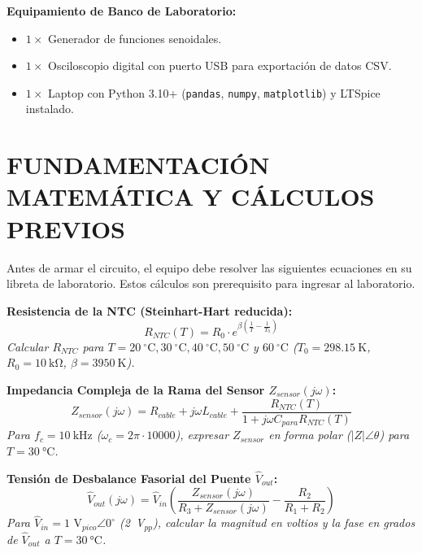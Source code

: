 \documentclass[11pt,a4paper]{article}
\begin{document}
\noindent\textbf{Equipamiento de Banco de Laboratorio:}
\begin{itemize}[label=$\circ$, itemsep=0pt]
    \item $1 \times$ Generador de funciones senoidales.
    \item $1 \times$ Osciloscopio digital con puerto USB para exportación de datos CSV.
    \item $1 \times$ Laptop con Python 3.10+ (\texttt{pandas}, \texttt{numpy}, \texttt{matplotlib}) y LTSpice instalado.
\end{itemize}

\section{FUNDAMENTACIÓN MATEMÁTICA Y CÁLCULOS PREVIOS}
\begin{info}
Antes de armar el circuito, el equipo debe resolver las siguientes ecuaciones en su libreta de laboratorio. Estos cálculos son prerequisito para ingresar al laboratorio.
\end{info}

\noindent\textbf{Resistencia de la NTC (Steinhart-Hart reducida):}
\begin{equation}
    R_{NTC}(T) = R_0 \cdot e^{\beta \left( \frac{1}{T} - \frac{1}{T_0} \right)}
\end{equation}
\textit{Calcular $R_{NTC}$ para $T = 20\ ^\circ\text{C}, 30\ ^\circ\text{C}, 40\ ^\circ\text{C}, 50\ ^\circ\text{C}$ y $60\ ^\circ\text{C}$ ($T_0 = \qty{298.15}{\kelvin}$, $R_0 = \qty{10}{\kilo\ohm}$, $\beta = \qty{3950}{\kelvin}$).}

\vspace{0.3cm}
\noindent\textbf{Impedancia Compleja de la Rama del Sensor $Z_{sensor}(j\omega)$:}
\begin{equation}
    Z_{sensor}(j\omega) = R_{cable} + j\omega L_{cable} + \frac{R_{NTC}(T)}{1 + j\omega C_{para} R_{NTC}(T)}
\end{equation}
\textit{Para $f_c = \qty{10}{\kilo\hertz}$ ($\omega_c = 2\pi \cdot 10000$), expresar $Z_{sensor}$ en forma polar ($\vert{}Z\vert{} \angle \theta$) para $T = \qty{30}{\celsius}$.}

\vspace{0.3cm}
\noindent\textbf{Tensión de Desbalance Fasorial del Puente $\hat{V}_{out}$:}
\begin{equation}
    \hat{V}_{out}(j\omega) = \hat{V}_{in} \left( \frac{Z_{sensor}(j\omega)}{R_3 + Z_{sensor}(j\omega)} - \frac{R_2}{R_1 + R_2} \right)
\end{equation}
\textit{Para $\hat{V}_{in} = 1\text{ V}_{pico} \angle 0^\circ$ (\qty{2}{\volt}$_{pp}$), calcular la magnitud en voltios y la fase en grados de $\hat{V}_{out}$ a $T = \qty{30}{\celsius}$.}
\end{document}
